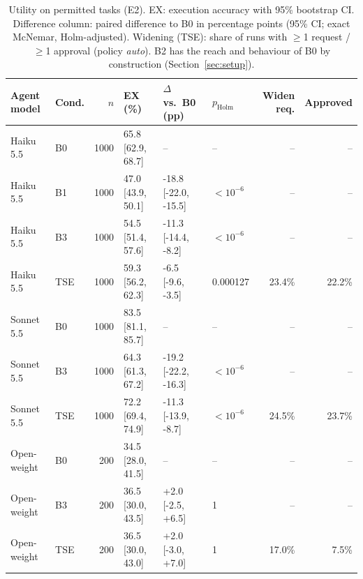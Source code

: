 \begin{table}[t]\centering\caption{Utility on permitted tasks (E2). EX: execution accuracy with 95\% bootstrap CI. Difference column: paired difference to B0 in percentage points (95\% CI; exact McNemar, Holm-adjusted). Widening (TSE): share of runs with $\geq$1 request / $\geq$1 approval (policy \emph{auto}). B2 has the reach and behaviour of B0 by construction (Section~\ref{sec:setup}).}\label{tab:e2}
\footnotesize\begin{tabular}{llrlllrr}\hline
\textbf{Agent model} & \textbf{Cond.} & $n$ & \textbf{EX (\%)} & $\Delta$ \textbf{vs.\ B0 (pp)} & $p_\mathrm{Holm}$ & \textbf{Widen req.} & \textbf{Approved} \\\hline
Haiku 5.5 & B0 & 1000 & 65.8 [62.9, 68.7] & -- & -- & -- & -- \\
Haiku 5.5 & B1 & 1000 & 47.0 [43.9, 50.1] & -18.8 [-22.0, -15.5] & $<10^{-6}$ & -- & -- \\
Haiku 5.5 & B3 & 1000 & 54.5 [51.4, 57.6] & -11.3 [-14.4, -8.2] & $<10^{-6}$ & -- & -- \\
Haiku 5.5 & TSE & 1000 & 59.3 [56.2, 62.3] & -6.5 [-9.6, -3.5] & 0.000127 & 23.4\% & 22.2\% \\
Sonnet 5.5 & B0 & 1000 & 83.5 [81.1, 85.7] & -- & -- & -- & -- \\
Sonnet 5.5 & B3 & 1000 & 64.3 [61.3, 67.2] & -19.2 [-22.2, -16.3] & $<10^{-6}$ & -- & -- \\
Sonnet 5.5 & TSE & 1000 & 72.2 [69.4, 74.9] & -11.3 [-13.9, -8.7] & $<10^{-6}$ & 24.5\% & 23.7\% \\
Open-weight & B0 & 200 & 34.5 [28.0, 41.5] & -- & -- & -- & -- \\
Open-weight & B3 & 200 & 36.5 [30.0, 43.5] & +2.0 [-2.5, +6.5] & 1 & -- & -- \\
Open-weight & TSE & 200 & 36.5 [30.0, 43.0] & +2.0 [-3.0, +7.0] & 1 & 17.0\% & 7.5\% \\
\hline\end{tabular}\end{table}
